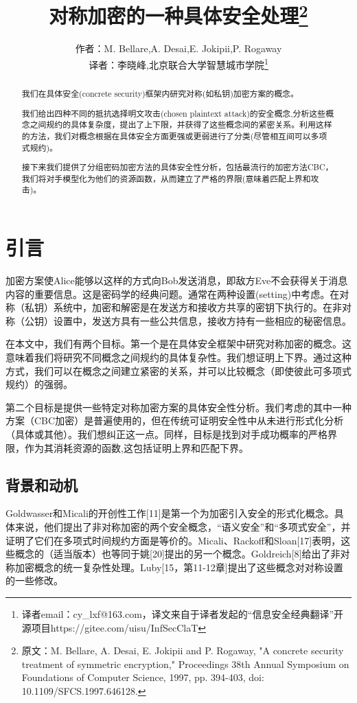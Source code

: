 \documentclass[]{article}
\title{对称加密的一种具体安全处理\footnote{原文：M. Bellare, A. Desai, E. Jokipii and P. Rogaway, "A concrete security treatment of symmetric encryption," Proceedings 38th Annual Symposium on Foundations of Computer Science, 1997, pp. 394-403, doi: 10.1109/SFCS.1997.646128.}}
\author{作者：M. Bellare,A. Desai,E. Jokipii,P. Rogaway\\
\small{译者：李晓峰,北京联合大学智慧城市学院\footnote{译者email：cy\_lxf@163.com，译文来自于译者发起的“信息安全经典翻译”开源项目https://gitee.com/uisu/InfSecClaT}}
}
\begin{document}
\maketitle


\begin{abstract}
我们在具体安全(concrete security)框架内研究对称(如私钥)加密方案的概念。\par
我们给出四种不同的抵抗选择明文攻击(chosen plaintext attack)的安全概念,分析这些概念之间规约的具体复杂度，提出了上下限，并获得了这些概念间的紧密关系。利用这样的方法，我们对概念根据在具体安全方面更强或更弱进行了分类(尽管相互间可以多项式规约)。\par
接下来我们提供了分组密码加密方法的具体安全性分析，包括最流行的加密方法CBC，我们将对手模型化为他们的资源函数，从而建立了严格的界限(意味着匹配上界和攻击)。
\end{abstract}

\section{引言}
加密方案使Alice能够以这样的方式向Bob发送消息，即敌方Eve不会获得关于消息内容的重要信息。这是密码学的经典问题。通常在两种设置(setting)中考虑。在对称（私钥）系统中，加密和解密是在发送方和接收方共享的密钥下执行的。在非对称（公钥）设置中，发送方具有一些公共信息，接收方持有一些相应的秘密信息。\par

在本文中，我们有两个目标。第一个是在具体安全框架中研究对称加密的概念。这意味着我们将研究不同概念之间规约的具体复杂性。我们想证明上下界。通过这种方式，我们可以在概念之间建立紧密的关系，并可以比较概念（即使彼此可多项式规约）的强弱。\par

第二个目标是提供一些特定对称加密方案的具体安全性分析。我们考虑的其中一种方案（CBC加密）是普遍使用的，但在传统可证明安全性中从未进行形式化分析（具体或其他）。我们想纠正这一点。同样，目标是找到对手成功概率的严格界限，作为其消耗资源的函数,这包括证明上界和匹配下界。

\subsection{背景和动机}
Goldwasser和Micali的开创性工作[11]是第一个为加密引入安全的形式化概念。具体来说，他们提出了非对称加密的两个安全概念，“语义安全”和“多项式安全”，并证明了它们在多项式时间规约方面是等价的。Micali、Rackoff和Sloan[17]表明，这些概念的（适当版本）也等同于姚[20]提出的另一个概念。Goldreich[8]给出了非对称加密概念的统一复杂性处理。Luby[15，第11-12章]提出了这些概念对对称设置的一些修改。
\par
\end{document}
